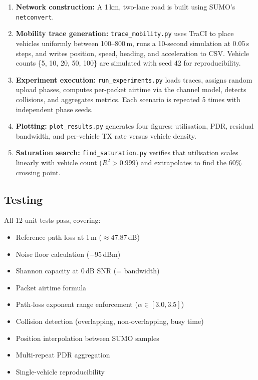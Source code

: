\documentclass[12pt, a4paper]{article}
\begin{document}
\begin{enumerate}
    \item \textbf{Network construction:} A 1\,km, two-lane road is built using
    SUMO's \texttt{netconvert}.

    \item \textbf{Mobility trace generation:} \texttt{trace\_mobility.py} uses
    TraCI to place vehicles uniformly between 100--800\,m, runs a 10-second
    simulation at 0.05\,s steps, and writes position, speed, heading, and
    acceleration to CSV.  Vehicle counts \{5, 10, 20, 50, 100\} are simulated
    with seed 42 for reproducibility.

    \item \textbf{Experiment execution:} \texttt{run\_experiments.py} loads
    traces, assigns random upload phases, computes per-packet airtime via the
    channel model, detects collisions, and aggregates metrics.  Each scenario
    is repeated 5 times with independent phase seeds.

    \item \textbf{Plotting:} \texttt{plot\_results.py} generates four figures:
    utilisation, PDR, residual bandwidth, and per-vehicle TX rate versus
    vehicle density.

    \item \textbf{Saturation search:} \texttt{find\_saturation.py} verifies
    that utilisation scales linearly with vehicle count ($R^2 > 0.999$) and
    extrapolates to find the 60\% crossing point.
\end{enumerate}

\subsection{Testing}

All 12 unit tests pass, covering:
\begin{itemize}
    \item Reference path loss at 1\,m ($\approx 47.87$\,dB)
    \item Noise floor calculation ($-95$\,dBm)
    \item Shannon capacity at 0\,dB SNR (= bandwidth)
    \item Packet airtime formula
    \item Path-loss exponent range enforcement ($\alpha \in [3.0, 3.5]$)
    \item Collision detection (overlapping, non-overlapping, busy time)
    \item Position interpolation between SUMO samples
    \item Multi-repeat PDR aggregation
    \item Single-vehicle reproducibility
\end{itemize}
\end{document}
